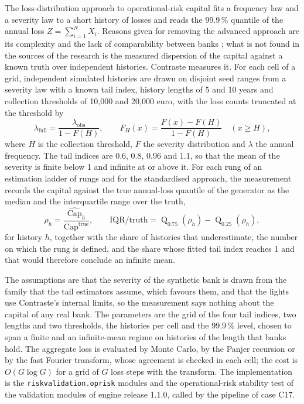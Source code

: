 The loss-distribution approach to operational-risk capital fits a frequency law and a severity law to a short history of losses and reads the 99.9\,\% quantile of the annual loss $Z=\sum_{i=1}^{N}X_i$. Reasons given for
removing the advanced approach are its complexity and the lack of comparability between banks \citep{oprisk:bcbs2016}; what is not found in the sources of the research is the measured dispersion of the capital against a known truth
over independent histories. Contraste measures it. For each cell of a grid, \pxTwelveHistoriesPerCell{} independent simulated histories are drawn on disjoint seed ranges from a severity law with a known tail index, history lengths of 5 and 10 years and
collection thresholds of 10,000 and 20,000 euro, with the loss counts truncated at the threshold by
\begin{equation}
\lambda_{\mathrm{full}}=\frac{\lambda_{\mathrm{obs}}}{1-F(H)},\qquad F_{H}(x)=\frac{F(x)-F(H)}{1-F(H)}\quad(x\ge H),
\label{eq:bs12-truncation}
\end{equation}
where $H$ is the collection threshold, $F$ the severity distribution and $\lambda$ the annual frequency. The tail indices are 0.6, 0.8, 0.96 and 1.1, so that the mean of the severity is finite below 1 and infinite at or above it. For each rung of an
estimation ladder of \pxTwelveRungs{} rungs and for the standardised approach, the measurement records the capital against the true annual-loss quantile of the generator as the median and the interquartile range over the truth,
\begin{equation}
\rho_{h}=\frac{\widehat{\mathrm{Cap}}_{h}}{\mathrm{Cap}^{\mathrm{true}}},\qquad
\mathrm{IQR}/\mathrm{truth}=\operatorname{Q}_{0.75}(\rho_{h})-\operatorname{Q}_{0.25}(\rho_{h}),
\label{eq:bs12-iqr}
\end{equation}
for history $h$, together with the share of histories that underestimate, the number on which the rung is defined, and the share whose fitted tail index reaches 1 and that would therefore conclude an infinite mean.

The assumptions are that the severity of the synthetic bank is drawn from the family that the tail estimators assume, which favours them, and that the lights use Contraste's internal limits, so the measurement
says nothing about the capital of any real bank. The parameters are the grid of the four tail indices, two lengths and two thresholds, the \pxTwelveHistoriesPerCell{} histories per cell and the 99.9\,\% level, chosen to span a finite and an infinite-mean
regime on histories of the length that banks hold. The aggregate loss is evaluated by Monte Carlo, by the Panjer recursion \citep{oprisk:panjer1981} or by the fast Fourier transform, whose agreement is checked in each cell; the cost is
$O(G\log G)$ for a grid of $G$ loss steps with the transform. The implementation is the \texttt{riskvalidation.oprisk} modules and the operational-risk stability test of the validation modules of engine release 1.1.0, called by the pipeline of case C17.


